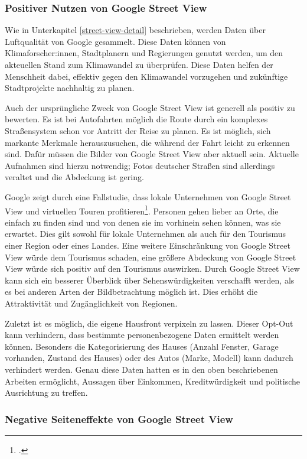 \subsubsection{Positiver Nutzen von Google Street View}

Wie in Unterkapitel \ref{street-view-detail} beschrieben, werden Daten über
Luftqualität von Google gesammelt. Diese Daten können von Klimaforscher:innen,
Stadtplanern und Regierungen genutzt werden, um den akteuellen Stand zum
Klimawandel zu überprüfen. Diese Daten helfen der Menschheit dabei, effektiv
gegen den Klimawandel vorzugehen und zukünftige Stadtprojekte nachhaltig zu
planen.

Auch der ursprüngliche Zweck von Google Street View ist generell als positiv zu
bewerten. Es ist bei Autofahrten möglich die Route durch ein komplexes
Straßensystem schon vor Antritt der Reise zu planen. Es ist möglich, sich
markante Merkmale herauszusuchen, die während der Fahrt leicht zu erkennen sind.
Dafür müssen die Bilder von Google Street View aber aktuell sein. Aktuelle
Aufnahmen sind hierzu notwendig; Fotos deutscher Straßen sind allerdings
veraltet und die Abdeckung ist gering.

Google zeigt durch eine Fallstudie, dass lokale Unternehmen von Google Street
View und virtuellen Touren
profitieren\footcite{website:google:impact-for-local-businesses}. Personen gehen
lieber an Orte, die einfach zu finden sind und von denen sie im vorhinein sehen
können, was sie erwartet. Dies gilt sowohl für lokale Unternehmen als auch für
den Tourismus einer Region oder eines Landes. Eine weitere Einschränkung von
Google Street View würde dem Tourismus schaden, eine größere Abdeckung von
Google Street View würde sich positiv auf den Tourismus auswirken. Durch Google
Street View kann sich ein besserer Überblick über Sehenswürdigkeiten verschafft
werden, als es bei anderen Arten der Bildbetrachtung möglich ist. Dies erhöht
die Attraktivität und Zugänglichkeit von Regionen.

Zuletzt ist es möglich, die eigene Hausfront verpixeln zu lassen. Dieser Opt-Out
kann verhindern, dass bestimmte personenbezogene Daten ermittelt werden können.
Besonders die Kategorisierung des Hauses (Anzahl Fenster, Garage vorhanden,
Zustand des Hauses) oder des Autos (Marke, Modell) kann dadurch verhindert
werden. Genau diese Daten hatten es in den oben beschriebenen Arbeiten
ermöglicht, Aussagen über Einkommen, Kreditwürdigkeit und politische Ausrichtung
zu treffen.

\subsubsection{Negative Seiteneffekte von Google Street View}

